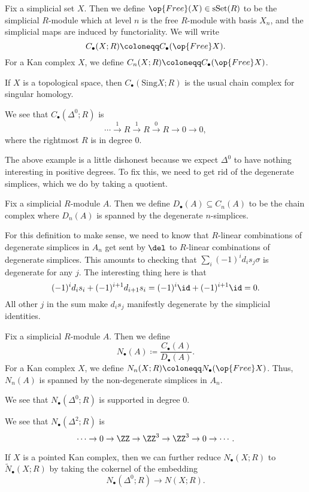 \documentclass[../notes.tex]{subfiles}
\begin{document}
\begin{definition}
	Fix a simplicial set $X$. Then we define $\op{Free}(X)\in\mathrm{sSet}(R)$ to be the simplicial $R$-module which at level $n$ is the free $R$-module with basis $X_n$, and the simplicial maps are induced by functoriality. We will write
	\[C_\bullet(X;R)\coloneqq C_\bullet(\op{Free}X).\]
	For a Kan complex $X$, we define $C_n(X;R)\coloneqq C_\bullet(\op{Free}X)$. 
\end{definition}
\begin{example}
	If $X$ is a topological space, then $C_\bullet(\mathrm{Sing}X;R)$ is the usual chain complex for singular homology.
\end{example}
\begin{example}
	We see that $C_\bullet\left(\Delta^0;R\right)$ is
	\[\cdots\stackrel 1\to R\stackrel1\to R\stackrel0\to R\to0\to0,\]
	where the rightmost $R$ is in degree $0$.
\end{example}
The above example is a little dishonest because we expect $\Delta^0$ to have nothing interesting in positive degrees. To fix this, we need to get rid of the degenerate simplices, which we do by taking a quotient.
\begin{notation}
	Fix a simplicial $R$-module $A$. Then we define $D_\bullet(A)\subseteq C_n(A)$ to be the chain complex where $D_n(A)$ is spanned by the degenerate $n$-simplices.
\end{notation}
\begin{remark}
	For this definition to make sense, we need to know that $R$-linear combinations of degenerate simplices in $A_n$ get sent by $\del$ to $R$-linear combinations of degenerate simplices. This amounts to checking that $\sum_i(-1)^id_is_j\sigma$ is degenerate for any $j$. The interesting thing here is that
	\[(-1)^id_is_i+(-1)^{i+1}d_{i+1}s_i=(-1)^i{\id}+(-1)^{i+1}{\id}=0.\]
	All other $j$ in the sum make $d_is_j$ manifestly degenerate by the simplicial identities.
\end{remark}
\begin{notation}
	Fix a simplicial $R$-module $A$. Then we define
	\[N_\bullet(A)\coloneqq\frac{C_\bullet(A)}{D_\bullet(A)}.\]
	For a Kan complex $X$, we define $N_n(X;R)\coloneqq N_\bullet(\op{Free}X)$. Thus, $N_n(A)$ is spanned by the non-degen\-erate simplices in $A_n$.
\end{notation}
\begin{example}
	We see that $N_\bullet\left(\Delta^0;R\right)$ is supported in degree $0$.
\end{example}
\begin{example}
	We see that $N_\bullet\left(\Delta^2;R\right)$ is
	\[\cdots\to0\to\ZZ\to\ZZ^3\to\ZZ^3\to0\to\cdots.\]
\end{example}
\begin{remark}
	If $X$ is a pointed Kan complex, then we can further reduce $N_\bullet(X;R)$ to $\widetilde N_\bullet(X;R)$ by taking the cokernel of the embedding
	\[N_\bullet\left(\Delta^0;R\right)\to N(X;R).\]
\end{remark}
\end{document}
